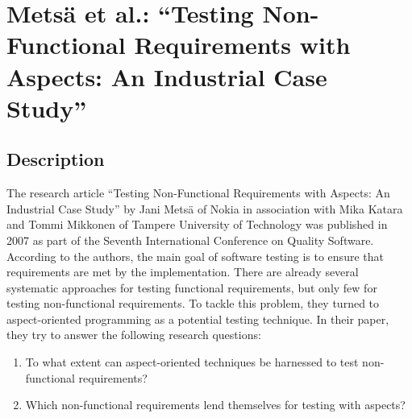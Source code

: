 \newpage
\section{Metsä et al.: “Testing Non-Functional Requirements with Aspects: An Industrial Case Study” } \label{given}

\subsection{Description}
The research article “Testing Non-Functional Requirements with Aspects: An Industrial Case Study” by Jani Metsä of Nokia in association with Mika Katara and Tommi Mikkonen \cite{Metsa} of Tampere University of Technology was published in 2007 as part of the Seventh International Conference on Quality Software. According to the authors, the main goal of software testing is to ensure that requirements are met by the implementation. There are already several systematic approaches for testing functional requirements, but only few for testing non-functional requirements. To tackle this problem, they turned to aspect-oriented programming as a potential testing technique. In their paper, they try to answer the following research questions:

\begin{enumerate}
\item To what extent can aspect-oriented techniques be harnessed to test non-functional requirements?
\item Which non-functional requirements lend themselves for testing with aspects?
\end{enumerate}

